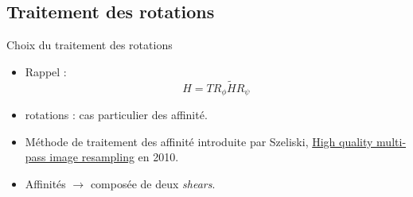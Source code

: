 \documentclass[c,12pt]{beamer}
\newcommand{\ra}[0]{\rightarrow}
\begin{document}
\subsection{Traitement des rotations}
\begin{frame}{Choix du traitement des rotations}



\begin{itemize}
\item Rappel : \[H = T R_\phi \tilde H R_\psi\]
\item rotations : cas particulier des affinité. 
\item Méthode de traitement des affinité introduite par Szeliski, \underline{High quality multi-pass image resampling} en 2010.
\item Affinités $\ra$ composée de deux \emph{shears}.

\end{itemize}
\end{frame}
\end{document}
